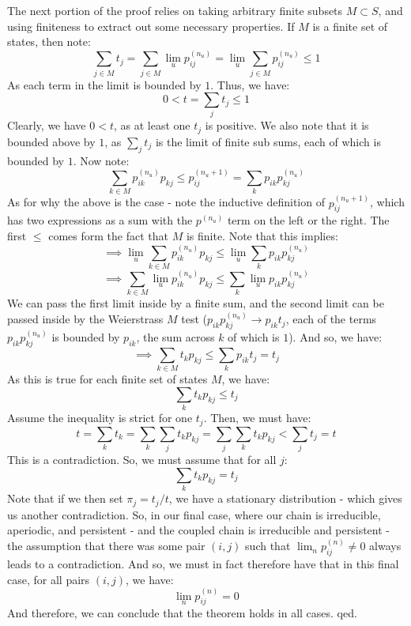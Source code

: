\documentclass[12pt,a4paper]{article}
\newcommand{\1}[1]{\mathbbm{1}\left\{ #1 \right\}}
\begin{document}
The next portion of the proof relies on taking arbitrary finite subsets $M \subset S$, and using finiteness to extract out some necessary properties. If $M$ is a finite set of states, then note:
$$
	\sum_{j \in M} t_j = \sum_{j \in M} \lim_u p_{ij}^{(n_u)} =
	\lim_u \sum_{j \in M} p_{ij}^{(n_u)} \leq 1
$$
As each term in the limit is bounded by $1$. Thus, we have:
$$
	0 < t = \sum_j t_j \leq 1
$$
Clearly, we have $0 < t$, as at least one $t_j$ is positive. We also note that it is bounded above by $1$, as $\sum_j t_j$ is the limit of finite sub sums, each of which is bounded by $1$. Now note:
$$
	\sum_{k \in M} p_{ik}^{(n_u)} p_{kj} \leq p_{ij}^{(n_u + 1)} =
	\sum_k p_{ik}p_{kj}^{(n_u)}
$$
As for why the above is the case - note the inductive definition of $p_{ij}^{(n_u + 1)}$, which has two expressions as a sum with the $p^{(n_u)}$ term on the left or the right. The first $\leq$ comes form the fact that $M$ is finite. Note that this implies:
$$
	\implies
	\lim_u \sum_{k \in M} p_{ik}^{(n_u)} p_{kj} \leq
	\lim_u \sum_k p_{ik}p_{kj}^{(n_u)}
$$
$$
	\implies
	\sum_{k \in M} \lim_u p_{ik}^{(n_u)} p_{kj} \leq
	\sum_k \lim_u p_{ik}p_{kj}^{(n_u)}
$$
We can pass the first limit inside by a finite sum, and the second limit can be passed inside by the Weierstrass $M$ test ($p_{ik}p_{kj}^{(n_u)} \to p_{ik}t_j$, each of the terms $p_{ik}p_{kj}^{(n_u)}$ is bounded by $p_{ik}$, the sum across $k$ of which is $1$). And so, we have:
$$
	\implies
	\sum_{k \in M} t_k p_{kj} \leq
	\sum_k p_{ik}t_j =
	t_j
$$
As this is true for each finite set of states $M$, we have:
$$
	\sum_k t_k p_{kj} \leq t_j
$$
Assume the inequality is strict for one $t_j$. Then, we must have:
$$
	t = \sum_k t_k =
	\sum_k \sum_j t_k p_{kj} =
	\sum_j \sum_k t_k p_{kj} <
	\sum_j t_j = t
$$
This is a contradiction. So, we must assume that for all $j$:
$$
	\sum_k t_k p_{kj} = t_j
$$
Note that if we then set $\pi_j = t_j/t$, we have a stationary distribution - which gives us another contradiction. So, in our final case, where our chain is irreducible, aperiodic, and persistent - and the coupled chain is irreducible and persistent - the assumption that there was some pair $(i,j)$ such that $\lim_n p_{ij}^{(n)} \neq 0$ always leads to a contradiction. And so, we must in fact therefore have that in this final case, for all pairs $(i,j)$, we have:
$$
	\lim_n p_{ij}^{(n)} = 0
$$
And therefore, we can conclude that the theorem holds in all cases. qed.
\end{document}
